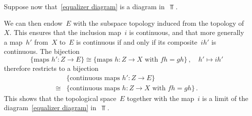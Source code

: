 Suppose now that~\eqref{equalizer diagram} is a diagram in~$\Top$.

We can then endow~$E$ with the subspace topology induced from the topology of~$X$.
This ensures that the inclusion map~$i$ is continuous, and that more generally a map~$h'$ from~$X$ to~$E$ is continuous if and only if its composite~$i h'$ is continuous.
The bijection
\[
	\{ \text{maps~$\textstyle h' \colon Z \to E$} \}
	≅
	\{ \text{maps~$\textstyle h \colon Z \to X$ with~$f h = g h$} \} \,,
	\quad
	h' \mapsto i h'
\]
therefore restricts to a bijection
\begin{align*}
	{}&
	\{ \textstyle \text{continuous maps~$h' \colon Z \to E$} \} \\
	≅{}&
	\{ \textstyle \text{continuous maps~$h \colon Z \to X$ with~$f h = g h$} \} \,.
\end{align*}
This shows that the topological space~$E$ together with the map~$i$ is a limit of the diagram~\eqref{equalizer diagram} in~$\Top$.

